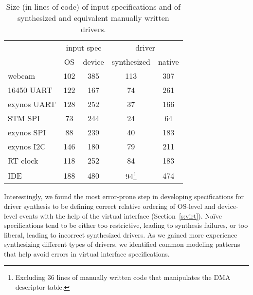 \documentclass[a4paper,twoside,openright,11pt]{book}
\theoremstyle{definition}
\begin{document}
\begin{table}
    \begin{minipage}{\linewidth}
    \center
    \begin{tabular}{|l|c|c|c|c|}
        \hline
        & \multicolumn{2}{|c|}{input spec} & \multicolumn{2}{c|}{driver} \\
        \cline{2-5}
                     & OS  & device & synthesized & native \\
        \hline
        \hline
        webcam       & 102 & 385    & 113         & 307 \\
        16450 UART   & 122 & 167    & 74          & 261 \\
        exynos UART  & 128 & 252    & 37          & 166 \\
        STM SPI      & 73  & 244    & 24          & 64  \\
        exynos SPI   & 88  & 239    & 40          & 183 \\
        exynos I2C   & 146 & 180    & 79          & 211 \\
        RT clock     & 118 & 252    & 84          & 183 \\
        IDE          & 188 & 480    & 94\footnote{Excluding 36 lines of manually written code that manipulates the DMA descriptor table.} & 474 \\
        \hline
    \end{tabular}
    \end{minipage}
    \caption{Size (in lines of code) of input specifications and of synthesized and equivalent manually written drivers.}
    \label{t:size}
\end{table}

Interestingly, we found the most error-prone step in developing specifications for driver synthesis to be defining correct relative ordering of OS-level and device-level events with the help of the virtual interface (Section~\ref{s:virt}).  Na\"ive specifications tend to be either too restrictive, leading to synthesis failures, or too liberal, leading to incorrect synthesized drivers. As we gained more experience synthesizing different types of drivers, we identified common modeling patterns that help avoid errors in virtual interface specifications.  
\end{document}
